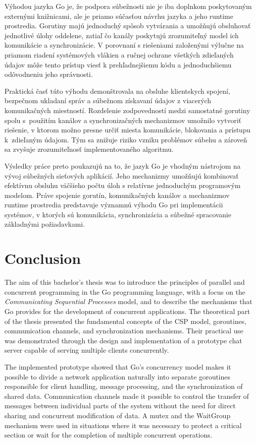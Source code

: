\documentclass[
  biblatex,
  seconds=true,
  language=slovak,
  figures=false,
  urldate=iso,
  glossaries,
  index
]{kidiplom}
\begin{document}
Výhodou jazyka Go je, že podpora súbežnosti nie je iba doplnkom poskytovaným externými knižnicami, ale je priamo súčasťou návrhu jazyka a jeho runtime prostredia. Gorutiny majú jednoduchý spôsob vytvárania a umožňujú obsluhovať jednotlivé úlohy oddelene, zatiaľ čo kanály poskytujú zrozumiteľný model ich komunikácie a synchronizácie. V porovnaní s riešeniami založenými výlučne na priamom riadení systémových vlákien a ručnej ochrane všetkých zdieľaných údajov môže tento prístup viesť k prehľadnejšiemu kódu a jednoduchšiemu odôvodneniu jeho správnosti.

Praktická časť túto výhodu demonštrovala na obsluhe klientskych spojení, bezpečnom ukladaní správ a súbežnom získavaní údajov z viacerých komunikačných miestností. Rozdelenie zodpovedností medzi samostatné gorutiny spolu s~použitím kanálov a synchronizačných mechanizmov umožnilo vytvoriť riešenie, v ktorom možno presne určiť miesta komunikácie, blokovania a prístupu k~zdieľaným údajom. Tým sa znižuje riziko vzniku problémov súbehu a zároveň sa zvyšuje zrozumiteľnosť implementovaného algoritmu.

Výsledky práce preto poukazujú na to, že jazyk Go je vhodným nástrojom na vývoj súbežných sieťových aplikácií. Jeho mechanizmy umožňujú kombinovať efektívnu obsluhu väčšieho počtu úloh s relatívne jednoduchým programovým modelom. Práve spojenie gorutín, komunikačných kanálov a mechanizmov runtime prostredia predstavuje významnú výhodu Go pri implementácii systémov, v ktorých sú komunikácia, synchronizácia a súbežné spracovanie základnými požiadavkami.

\newpage
\section{Conclusion}
The aim of this bachelor's thesis was to introduce the principles of parallel and concurrent programming in the Go programming language, with a focus on the \textit{Communicating Sequential Processes} model, and to describe the mechanisms that Go provides for the development of concurrent applications. The theoretical part of the thesis presented the fundamental concepts of the CSP model, goroutines, communication channels, and synchronization mechanisms. Their practical use was demonstrated through the design and implementation of a prototype chat server capable of serving multiple clients concurrently.

The implemented prototype showed that Go's concurrency model makes it possible to divide a network application naturally into separate goroutines responsible for client handling, message processing, and the synchronization of shared data. Communication channels made it possible to control the transfer of messages between individual parts of the system without the need for direct sharing and concurrent modification of data. A mutex and the WaitGroup mechanism were used in situations where it was necessary to protect a critical section or wait for the completion of multiple concurrent operations.
\end{document}

